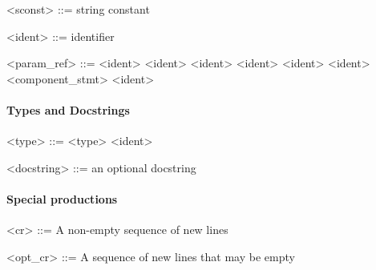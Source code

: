 \begin{grammar}
  <sconst> ::= string constant
\end{grammar}

\vs

\begin{grammar}
  <ident> ::= identifier
\end{grammar}

\vs

\begin{grammar}
  <param_ref> ::=   <ident>
  \alt {}  <ident>
  \alt <ident>    <ident>
  \alt <ident>    <ident>
  \alt \tn{(} <component_stmt> \tn{)}    <ident>
\end{grammar}


\paragraph{Types and Docstrings}

\begin{grammar}
  <type> ::= 
  \alt {}
  \alt {}
  \alt {}
  \alt \tn{$[$} <type> \tn{$]$}
  \alt <ident>
\end{grammar}

\vs

\begin{grammar}
  <docstring> ::= an optional docstring
\end{grammar}


\paragraph{Special productions}

\begin{grammar}
  <cr> ::= A non-empty sequence of new lines
\end{grammar}

\vs

\begin{grammar}
  <opt_cr> ::= A sequence of new lines that may be empty
\end{grammar}

\vs

